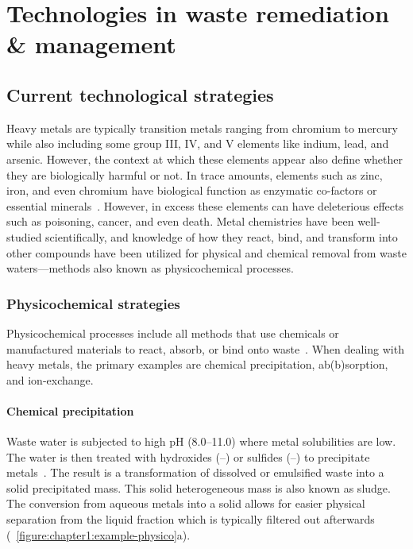 \documentclass[../main/main]{subfiles}
\begin{document}
\chapter{Technologies in waste remediation \& management}
\label{chapter1}
\renewcommand{\figurename}{Figure}

\section{Current technological strategies}
Heavy metals are typically transition metals ranging from chromium to mercury while also including some group III, IV, and V elements like indium, lead, and arsenic. However, the context at which these elements appear also define whether they are biologically harmful or not. In trace amounts, elements such as zinc, iron, and even chromium have biological function as enzymatic co-factors or essential minerals~\cite{althuis2002}. However, in excess these elements can have deleterious effects such as poisoning, cancer, and even death. Metal chemistries have been well-studied scientifically, and knowledge of how they react, bind, and transform into other compounds have been utilized for physical and chemical removal from waste waters---methods also known as physicochemical processes.

\subsection{Physicochemical strategies}
Physicochemical processes include all methods that use chemicals or manufactured materials to react, absorb, or bind onto waste~\cite{fu2011}. When dealing with heavy metals, the primary examples are chemical precipitation, ab(b)sorption, and ion-exchange.

\subsubsection*{Chemical precipitation}
Waste water is subjected to high pH (8.0--11.0) where metal solubilities are low. The water is then treated with hydroxides (--) or sulfides (--) to precipitate metals~\cite{charerntanyarak1999heavy,ku2001photocatalytic}. The result is a transformation of dissolved or emulsified waste into a solid precipitated mass. This solid heterogeneous mass is also known as sludge.
The conversion from aqueous metals into a solid allows for easier physical separation from the liquid fraction which is typically filtered out afterwards (\FIGURE~\ref{figure:chapter1:example-physico}a).
\end{document}
